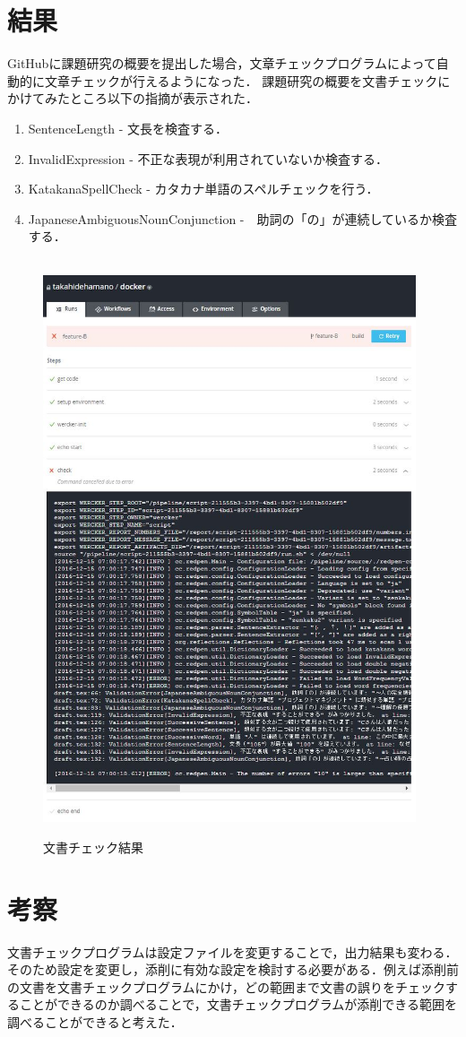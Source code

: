 \chapter{結果}
GitHubに課題研究の概要を提出した場合，文章チェックプログラムによって自動的に文章チェックが行えるようになった．
課題研究の概要を文書チェックにかけてみたところ以下の指摘が表示された．
\begin{enumerate}
\item SentenceLength - 文長を検査する．
\item InvalidExpression - 不正な表現が利用されていないか検査する．
\item KatakanaSpellCheck - カタカナ単語のスペルチェックを行う．
\item JapaneseAmbiguousNounConjunction -　助詞の「の」が連続しているか検査する．
\end{enumerate}
\begin{figure}[htb]
\centering　
\includegraphics[width=11cm]{34.JPG}
\caption{文書チェック結果}
\end{figure}

\chapter{考察}
文書チェックプログラムは設定ファイルを変更することで，出力結果も変わる．そのため設定を変更し，添削に有効な設定を検討する必要がある．例えば添削前の文書を文書チェックプログラムにかけ，どの範囲まで文書の誤りをチェックすることができるのか調べることで，文書チェックプログラムが添削できる範囲を調べることができると考えた．
